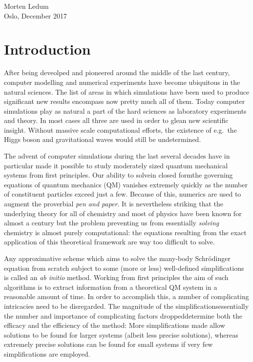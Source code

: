 \documentclass[twoside,english]{uiofysmaster}
\begin{document}
\begin{acknowledgements}
  \begin{flushright}
  Morten Ledum \\ Oslo, December 2017
  \end{flushright}

\end{acknowledgements}

\tableofcontents

\chapter{Introduction}
After being deveolped and pioneered around the middle of the last century, computer modelling and numerical experiments have become ubiquitous in the natural sciences. The list of areas in which simulations have been used to produce significant new results encompass now pretty much all of them. Today computer simulations play as natural a part of the hard sciences as laboratory experiments and theory. In most cases all three are used in order to glean new scientific insight. Without massive scale computational efforts, the existence of e.g.\ the Higgs boson and gravitational waves would still be undetermined.

The advent of computer simulations during the last several decades have in particular made it possible to study moderately sized quantum mechanical systems from first principles. Our ability to solve\textemdash in closed form\textemdash the governing equations of quantum mechanics (QM) vanishes extremely quickly as the number of constituent particles exceed just a few. Because of this, numerics are used to augment the proverbial \emph{pen and paper}. It is nevertheless striking that the underlying theory for all of chemistry and most of physics have been known for almost a century but the problem preventing us from essentially \emph{solving} chemistry is almost purely computational: the equations resulting from the exact application of this theoretical framework are way too difficult to solve.

Any approximative scheme which aims to solve the many-body Schrödinger equation from scratch subject to some (more or less) well-defined simplifications is called an \emph{ab initio} method. Working from first principles the aim of such algorithms is to extract information from a theoretical QM system in a reasonable amount of time. In order to accomplish this, a number of complicating intricacies need to be disregarded. The magnitude of the simplifications\textemdash essentially the number and importance of complicating factors dropped\textemdash determine both the efficacy and the efficiency of the method: More simplifications made allow solutions to be found for larger systems (albeit less precise solutions), whereas extremely precise solutions can be found for small systems if very few simplifications are employed.
\end{document}
